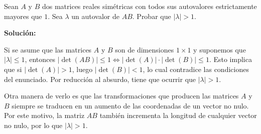 \documentclass[../../main.tex]{subfiles}
\begin{document}
  \begin{shaded}
    Sean $A$ y $B$ dos matrices reales simétricas con todos sus autovalores estrictamente mayores que $1$. Sea $\lambda$ un autovalor de $AB$. Probar que $|\lambda| > 1$.
  \end{shaded}

  \textbf{Solución:}

  Si se asume que las matrices $A$ y $B$ son de dimensiones $1 \times 1$ y suponemos que $|\lambda| \leq 1$, entonces $|\det{(AB)}| \leq 1 \iff |\det{(A)}| \cdot |\det{(B)}| \leq 1$. Esto implica que si $|\det{(A)}| > 1$, luego $|\det{(B)}| < 1$, lo cual contradice las condiciones del enunciado. Por reducción al absurdo, tiene que ocurrir que $|\lambda| > 1$.

  Otra manera de verlo es que las transformaciones que producen las matrices $A$ y $B$ siempre se traducen en un aumento de las coordenadas de un vector no nulo. Por este motivo, la matriz $AB$ también incrementa la longitud de cualquier vector no nulo, por lo que $|\lambda| > 1$.
\end{document}
